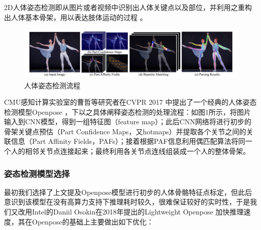 \documentclass[12pt,a4paper]{article}%
\begin{document}
2D人体姿态检测即从图片或者视频中识别出人体关键点以及部位，并利用之重构出人体基本骨架，用以表达肢体运动的过程 \cite{Deepcut}。

\begin{figure}[!h]
\centering
\includegraphics[width=.9\textwidth]{./Part3-Design.pic/image-20230102113745736.png}
\caption{人体姿态检测流程}
\end{figure}
\par
CMU感知计算实验室的曹哲等研究者在CVPR 2017
中提出了一个经典的人体姿态检测模型Openpose
\cite{openpose}
，下以之具体阐释姿态检测的处理流程：如图1所示，将图片输入到CNN模型，得到一组特征图（feature
map）；此后CNN网络将进行初步的骨架关键点预估（Part Confidence
Maps，又hotmaps）并提取各个关节之间的关联信息（Part Affinity
Fields，PAFs）；接着根据PAF信息利用偶匹配算法将同一个人的相邻关节点连接起来；最终利用各关节点连线组装成一个人的整体骨架。

\subsubsection{姿态检测模型选择}
最初我们选择了上文提及Openpose模型进行初步的人体骨骼特征点标定，但此后意识到该模型在没有高算力支持下推理耗时较久，很难保证较好的实时性，于是我们又改用Intel的Daniil
Osokin在2018年提出的Lightweight
Openpose	\cite{lw_openpose}
加快推理速度，其在Openpose的基础上主要做出如下优化：
\end{document}
